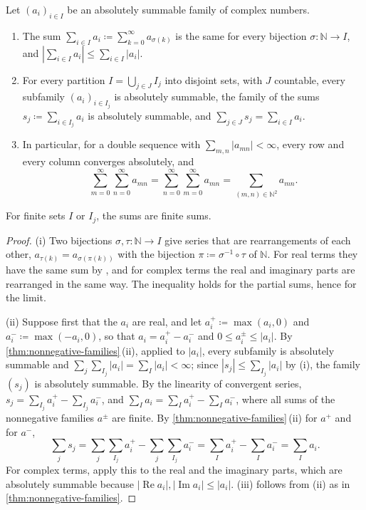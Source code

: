 \begin{theorem}
\label{thm:summable-families}
Let $(a_i)_{i\in I}$ be an absolutely summable family of complex numbers.
\begin{enumerate}
\item The sum $\sum_{i\in I}a_i\coloneqq\sum_{k=0}^\infty a_{\sigma(k)}$ is the same for every bijection $\sigma\colon\mathbb N\to I$, and $|\sum_{i\in I}a_i|\le\sum_{i\in I}|a_i|$.
\item For every partition $I=\bigcup_{j\in J}I_j$ into disjoint sets, with $J$ countable, every subfamily $(a_i)_{i\in I_j}$ is absolutely summable, the family of the sums $s_j\coloneqq\sum_{i\in I_j}a_i$ is absolutely summable, and $\sum_{j\in J}s_j=\sum_{i\in I}a_i$.
\item In particular, for a double sequence with $\sum_{m,n}|a_{mn}|<\infty$, every row and every column converges absolutely, and
\[
\sum_{m=0}^\infty\sum_{n=0}^\infty a_{mn}=\sum_{n=0}^\infty\sum_{m=0}^\infty a_{mn}=\sum_{(m,n)\in\mathbb N^2}a_{mn} .
\]
\end{enumerate}
For finite sets $I$ or $I_j$, the sums are finite sums.
\end{theorem}

\begin{proof}
(i) Two bijections $\sigma,\tau\colon\mathbb N\to I$ give series that are rearrangements of each other, $a_{\tau(k)}=a_{\sigma(\pi(k))}$ with the bijection $\pi\coloneqq\sigma^{-1}\circ\tau$ of $\mathbb N$. For real terms they have the same sum by , and for complex terms the real and imaginary parts are rearranged in the same way. The inequality holds for the partial sums, hence for the limit.

(ii) Suppose first that the $a_i$ are real, and let $a_i^+\coloneqq\max(a_i,0)$ and $a_i^-\coloneqq\max(-a_i,0)$, so that $a_i=a_i^+-a_i^-$ and $0\le a_i^\pm\le|a_i|$. By \cref{thm:nonnegative-families}\,(ii), applied to $|a_i|$, every subfamily is absolutely summable and $\sum_j\sum_{I_j}|a_i|=\sum_I|a_i|<\infty$; since $|s_j|\le\sum_{I_j}|a_i|$ by (i), the family $(s_j)$ is absolutely summable. By the linearity of convergent series, $s_j=\sum_{I_j}a_i^+-\sum_{I_j}a_i^-$, and $\sum_Ia_i=\sum_Ia_i^+-\sum_Ia_i^-$, where all sums of the nonnegative families $a^\pm$ are finite. By \cref{thm:nonnegative-families}\,(ii) for $a^+$ and for $a^-$,
\[
\sum_js_j=\sum_j\sum_{I_j}a_i^+-\sum_j\sum_{I_j}a_i^-=\sum_Ia_i^+-\sum_Ia_i^-=\sum_Ia_i .
\]
For complex terms, apply this to the real and the imaginary parts, which are absolutely summable because $|\operatorname{Re}a_i|,|\operatorname{Im}a_i|\le|a_i|$. (iii) follows from (ii) as in \cref{thm:nonnegative-families}.
\end{proof}

